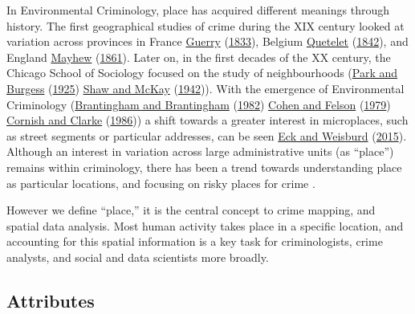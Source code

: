 \documentclass[
]{book}
\begin{document}
In Environmental Criminology, place has acquired different meanings through history. The first geographical studies of crime during the XIX century looked at variation across provinces in France \protect\hyperlink{ref-Guerry_1833}{Guerry} (\protect\hyperlink{ref-Guerry_1833}{1833}), Belgium \protect\hyperlink{ref-Quetelet_1842}{Quetelet} (\protect\hyperlink{ref-Quetelet_1842}{1842}), and England \protect\hyperlink{ref-Mayhew_1861}{Mayhew} (\protect\hyperlink{ref-Mayhew_1861}{1861}). Later on, in the first decades of the XX century, the Chicago School of Sociology focused on the study of neighbourhoods (\protect\hyperlink{ref-Park_1925}{Park and Burgess} (\protect\hyperlink{ref-Park_1925}{1925}) \protect\hyperlink{ref-Shaw_1942}{Shaw and McKay} (\protect\hyperlink{ref-Shaw_1942}{1942})). With the emergence of Environmental Criminology (\protect\hyperlink{ref-Brantingham_1982}{Brantingham and Brantingham} (\protect\hyperlink{ref-Brantingham_1982}{1982}) \protect\hyperlink{ref-Cohen_1979}{Cohen and Felson} (\protect\hyperlink{ref-Cohen_1979}{1979}) \protect\hyperlink{ref-Cornish_1986}{Cornish and Clarke} (\protect\hyperlink{ref-Cornish_1986}{1986})) a shift towards a greater interest in microplaces, such as street segments or particular addresses, can be seen \protect\hyperlink{ref-Eck_2015}{Eck and Weisburd} (\protect\hyperlink{ref-Eck_2015}{2015}). Although an interest in variation across large administrative units (as ``place'') remains within criminology, there has been a trend towards understanding place as particular locations, and focusing on risky places for crime .

However we define ``place,'' it is the central concept to crime mapping, and spatial data analysis. Most human activity takes place in a specific location, and accounting for this spatial information is a key task for criminologists, crime analysts, and social and data scientists more broadly.

\hypertarget{attributes}{%
\subsection{Attributes}\label{attributes}}
\end{document}
